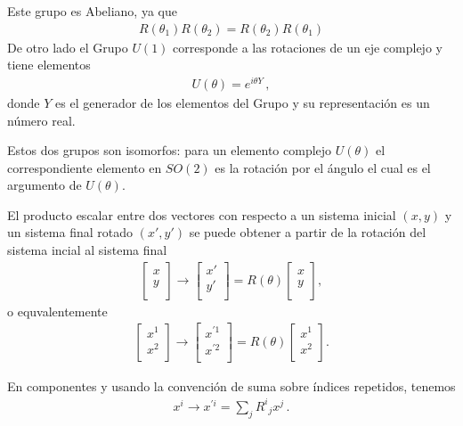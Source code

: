 Este grupo es Abeliano, ya que
\begin{align}
  R(\theta_1)R(\theta_2)=R(\theta_2)R(\theta_1)
\end{align}
De otro lado el Grupo $U(1)$ corresponde a las rotaciones de un eje complejo y tiene elementos
\begin{align}
  U(\theta)=e^{i \theta Y}\,,
\end{align}
donde $Y$ es el generador de los elementos del Grupo y su representación es un número real. 

Estos dos grupos son isomorfos: para un elemento complejo $U(\theta)$ el correspondiente elemento en $SO(2)$ es la rotación por el ángulo el cual es el argumento de $U(\theta)$.

El producto escalar entre dos vectores con respecto a un sistema inicial $(x,y)$  y un sistema final rotado  $(x', y')$ se puede obtener a partir de la rotación del sistema incial al sistema final
\begin{align}
\begin{bmatrix}
    x\\
    y\\
  \end{bmatrix} \to  \begin{bmatrix}
    x'\\
    y'\\
  \end{bmatrix}=R(\theta)  \begin{bmatrix}
    x\\
    y\\
  \end{bmatrix} ,
\end{align}
o equvalentemente 
\begin{align}
\begin{bmatrix}
    x^1\\
    x^2\\
  \end{bmatrix}\to  \begin{bmatrix}
    x^{\prime 1}\\
    x ^{\prime 2} \\
  \end{bmatrix}=R(\theta)  \begin{bmatrix}
    x^1\\
    x^2\\
  \end{bmatrix}.
\end{align}

En componentes y usando la convención de suma sobre índices repetidos, tenemos
\begin{align}
  \label{eq:rso2}
  x^i\to x^{\prime i}=\sum_j{R^i}_j x^j\,.
\end{align}

